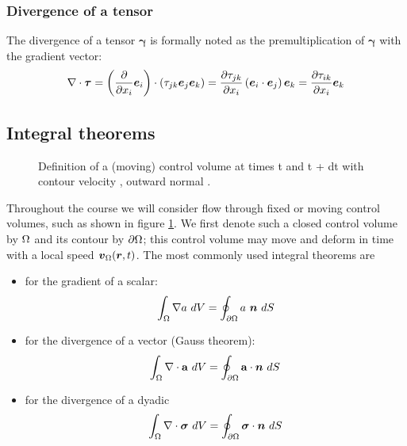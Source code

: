 \subsubsection{Divergence of a tensor}

The divergence of a tensor $\boldsymbol \gamma$ is formally
noted as the premultiplication of $\boldsymbol \gamma$ with the
gradient vector:
\begin{align*}
  \begin{split}
    \nabla \cdot \boldsymbol {\tau} 
    = \left(\frac{\partial }{\partial x_i} \boldsymbol e_{i}\right) \cdot 
    \left(\tau_{jk} \boldsymbol e_{j} \boldsymbol e_{k}\right) 
    = \frac{\partial \tau_{jk}}{\partial x_i} 
    \left(\boldsymbol e_{i} \cdot \boldsymbol e_{j} \right) \boldsymbol e_{k} 
    = \frac{\partial \tau_{ik}}{\partial x_i} \boldsymbol e_{k}
  \end{split}
\end{align*}

\subsection{Integral theorems} 
\label{subsec:principles:integralTheorems}

\begin{figure}[!h]
  \caption{Definition of a (moving) control volume at times t and t +
    dt with contour velocity \aVelV, outward normal \nrmV.}
  \label{fig:transportTheorem}
\end{figure}
Throughout the course we will consider flow through fixed or moving
control volumes, such as shown in figure
\ref{fig:transportTheorem}. We first denote such a closed control
volume by $\Omega$ and its contour by ${\partial \Omega}$; this control volume may
move and deform in time with a local speed $\boldsymbol {v}_{\Omega}(\boldsymbol {r},t)$. The
most commonly used integral theorems are
\begin{itemize}
\item for the gradient of a scalar:
  \begin{align*}
    \int_{\Omega} \nabla a ~ dV = \oint_{{\partial \Omega}} a~\boldsymbol {n}~dS 
  \end{align*}
\item for the divergence of a vector (Gauss theorem):
  \begin{align*}
    \int_{\Omega} \nabla \cdot \mathbf a~dV = \oint_{{\partial \Omega}} \mathbf a \cdot \boldsymbol {n}~dS 
  \end{align*}
\item for the divergence of a dyadic 
  \begin{align*}
    \int_{\Omega} \nabla \cdot \boldsymbol {\sigma}~dV = \oint_{{\partial \Omega}} \boldsymbol {\sigma} \cdot \boldsymbol {n}~dS
  \end{align*}
\end{itemize}

